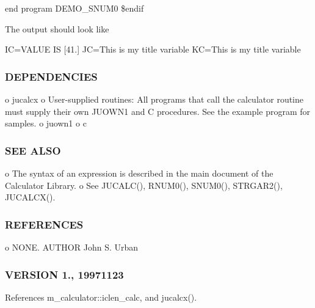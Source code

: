 end program D\+E\+M\+O\+\_\+\+S\+N\+U\+M0 \$endif

The output should look like

IC=V\+A\+L\+UE IS \mbox{[}41.\mbox{]} JC=This is my title variable KC=This is my title variable

\subsubsection*{D\+E\+P\+E\+N\+D\+E\+N\+C\+I\+ES}

o jucalcx o User-\/supplied routines\+: All programs that call the calculator routine must supply their own J\+U\+O\+W\+N1 and C procedures. See the example program for samples. o juown1 o c

\subsubsection*{S\+EE A\+L\+SO}

o The syntax of an expression is described in the main document of the Calculator Library. o See J\+U\+C\+A\+L\+C(), R\+N\+U\+M0(), S\+N\+U\+M0(), S\+T\+R\+G\+A\+R2(), J\+U\+C\+A\+L\+C\+X().

\subsubsection*{R\+E\+F\+E\+R\+E\+N\+C\+ES}

o N\+O\+NE. A\+U\+T\+H\+OR John S. Urban \subsubsection*{V\+E\+R\+S\+I\+ON 1., 19971123}

References m\+\_\+calculator\+::iclen\+\_\+calc, and jucalcx().

